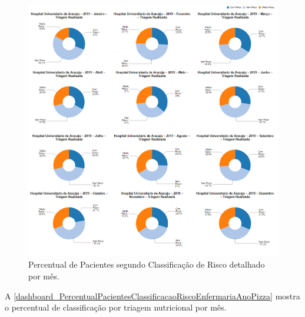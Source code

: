 \begin{figure}[htb]
	\caption{\label{dashboard_PercentualPacientesClassificacaoRiscoHospitalMesPizza}Percentual de Pacientes segundo Classificação de Risco detalhado por mês.}
	\begin{center}
	    \includegraphics[scale=0.6]{Imagens/2.2.PercentualPacientesClassificacaoRiscoHospitalMesPizza.png}
	\end{center}
\end{figure}

\clearpage
A \autoref{dashboard_PercentualPacientesClassificacaoRiscoEnfermariaAnoPizza} mostra o percentual de classificação por triagem nutricional por mês.

